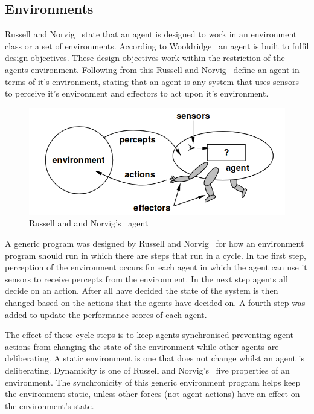 \documentclass[]{final_report}
\begin{document}
\subsection{Environments}
Russell and Norvig~\cite{russell2016artificial} state that an agent is designed to work in an environment class or a set of environments. According to Wooldridge~\cite{wooldridge_jennings_1995} an agent is built to fulfil design objectives. These design objectives work within the restriction of the agents environment. Following from this Russell and Norvig~\cite{russell2016artificial} define an agent in terms of it's environment, stating that an agent is any system that uses sensors to perceive it's environment and effectors to act upon it's environment.\par
\begin{figure}
\vspace{-20pt}
\begin{framed}
	\center
	\includegraphics[width=\textwidth]{russellnorvigagent.png}
	\caption{Russell and and Norvig's~\cite{russell2016artificial} agent}
	\label{fig:rnagent}
\end{framed}
\vspace{-20pt}
\end{figure}
A generic program was designed by Russell and Norvig~\cite{russell2016artificial} for how an environment program should run in which there are steps that run in a cycle. In the first step, perception of the environment occurs for each agent in which the agent can use it sensors to receive percepts from the environment. In the next step agents all decide on an action. After all have decided the state of the system is then changed based on the actions that the agents have decided on. A fourth step was added to update the performance scores of each agent.\par 
The effect of these cycle steps is to keep agents synchronised preventing agent actions from changing the state of the environment while other agents are deliberating. A static environment is one that does not change whilst an agent is deliberating. Dynamicity is one of Russell and Norvig's~\cite{russell2016artificial} five properties of an environment. The synchronicity of this generic environment program helps keep the environment static, unless other forces (not agent actions) have an effect on the environment's state.\par 
\end{document}
